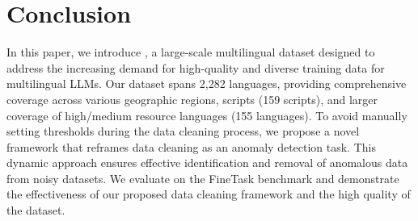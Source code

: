 \section{Conclusion}
\label{sec:conclusion}
In this paper, we introduce \dcad, a large-scale multilingual dataset designed to address the increasing demand for high-quality and diverse training data for multilingual LLMs.
Our dataset spans 2,282 languages, providing comprehensive coverage across various geographic regions, scripts (159 scripts), and larger coverage of high/medium resource languages (155 languages).
To avoid manually setting thresholds during the data cleaning process, we propose a novel framework that reframes data cleaning as an anomaly detection task. 
This dynamic approach ensures effective identification and removal of anomalous data from noisy datasets.
We evaluate \dcad on the FineTask benchmark and demonstrate the effectiveness of our proposed data cleaning framework and the high quality of the \dcad dataset.